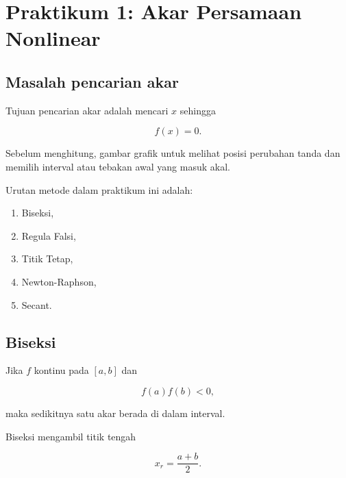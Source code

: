 \chapter{Praktikum 1: Akar Persamaan Nonlinear}



\section{Masalah pencarian akar}

Tujuan pencarian akar adalah mencari $x$ sehingga

\begin{equation}
f(x)=0.
\end{equation}

Sebelum menghitung, gambar grafik untuk melihat posisi perubahan tanda dan memilih interval atau tebakan awal yang masuk akal.

Urutan metode dalam praktikum ini adalah:

\begin{enumerate}
\item Biseksi,
\item Regula Falsi,
\item Titik Tetap,
\item Newton-Raphson,
\item Secant.
\end{enumerate}

\section{Biseksi}

Jika $f$ kontinu pada $[a,b]$ dan

\begin{equation}
f(a)f(b)<0,
\end{equation}

maka sedikitnya satu akar berada di dalam interval.

Biseksi mengambil titik tengah

\begin{equation}
x_r=\frac{a+b}{2}.
\end{equation}

